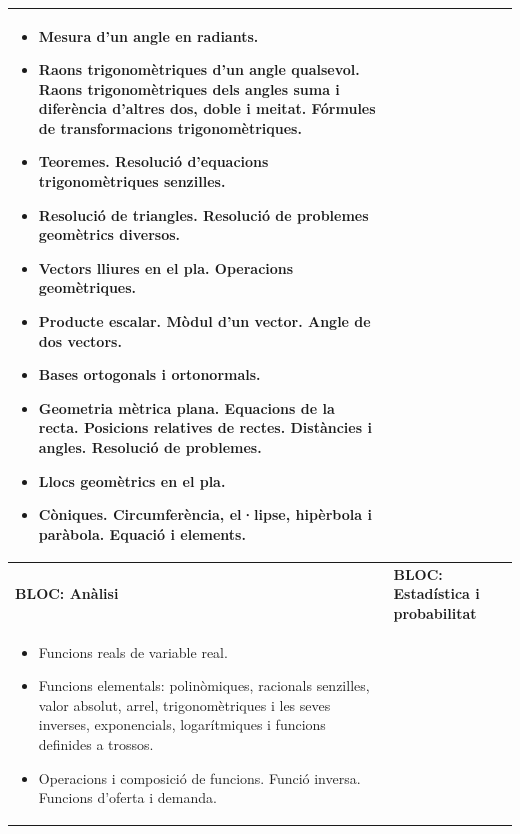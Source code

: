\begin{center}
\begin{tabular}{|p{}|p{}|}
\begin{itemize}
			\item 	Mesura d’un angle en radiants.
			
			\item Raons trigonomètriques d’un angle qualsevol. Raons trigonomètriques dels angles suma i diferència d’altres dos, doble i meitat. Fórmules de  transformacions trigonomètriques.
			
			\item Teoremes. Resolució d’equacions trigonomètriques senzilles.
			
			\item Resolució de triangles. Resolució de problemes geomètrics diversos.
			
			\item Vectors lliures en el pla. Operacions geomètriques.
			
			\item Producte escalar. Mòdul d’un vector. Angle de dos vectors.
			
			\item Bases ortogonals i ortonormals.
			
			\item Geometria mètrica plana. Equacions de la recta. Posicions relatives de rectes. Distàncies i angles. Resolució de problemes.
			
			\item Llocs geomètrics en el pla.
			
			\item Còniques. Circumferència, el·lipse, hipèrbola i paràbola. Equació i elements.
			
			
		\end{itemize}
		\\ \hline
		
		\rowcolor{lightgray}  \textbf{BLOC: Anàlisi} & \textbf{BLOC: Estadística i probabilitat}  \\ \hline
		
		\begin{itemize}
			
			\item 	Funcions reals de variable real.
			
			\item Funcions elementals: polinòmiques, racionals senzilles, valor absolut, arrel, trigonomètriques i les seves inverses, exponencials, logarítmiques i funcions definides a trossos.
			
			\item Operacions i composició de funcions. Funció inversa. Funcions d’oferta i demanda.
			

\end{itemize}
\end{tabular}
\end{center}
